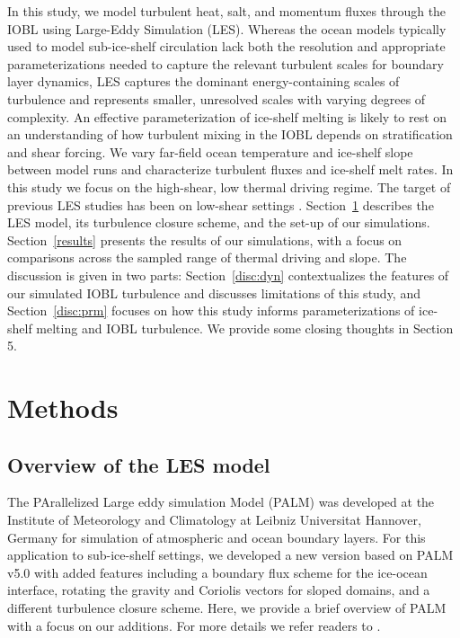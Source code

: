 \documentclass[tc, manuscript]{copernicus}
\begin{document}
In this study, we model turbulent heat, salt, and momentum fluxes through the IOBL using Large-Eddy Simulation (LES). Whereas the ocean models typically used to model sub-ice-shelf circulation lack both the resolution and appropriate parameterizations needed to capture the relevant turbulent scales for boundary layer dynamics, LES captures the dominant energy-containing scales of turbulence and represents smaller, unresolved scales with varying degrees of complexity. An effective parameterization of ice-shelf melting is likely to rest on an understanding of how turbulent mixing in the IOBL depends on stratification and shear forcing. We vary far-field ocean temperature and ice-shelf slope between model runs and characterize turbulent fluxes and ice-shelf melt rates. In this study we focus on the high-shear, low thermal driving regime. The target of previous LES studies has been on low-shear settings \citep{middleton_numerical_2021, vreugdenhil_stratification_2019}. Section~\ref{meth} describes the LES model, its turbulence closure scheme, and the set-up of our simulations. Section~\ref{results} presents the results of our simulations, with a focus on comparisons across the sampled range of thermal driving and slope. The discussion is given in two parts: Section~\ref{disc:dyn} contextualizes the features of our simulated IOBL turbulence and discusses limitations of this study, and Section~\ref{disc:prm} focuses on how this study informs parameterizations of ice-shelf melting and IOBL turbulence. We provide some closing thoughts in Section 5.

\section{Methods}\label{meth}

\subsection{Overview of the LES model}

The PArallelized Large eddy simulation Model (PALM) was developed at the Institute of Meteorology and Climatology at Leibniz Universitat Hannover, Germany \citep{raasch_palm-large-eddy_2001} for simulation of atmospheric and ocean boundary layers. For this application to sub-ice-shelf settings, we developed a new version based on PALM v5.0 \citep{maronga_parallelized_2015} with added features including a boundary flux scheme for the ice-ocean interface, rotating the gravity and Coriolis vectors for sloped domains, and a different turbulence closure scheme. Here, we provide a brief overview of PALM with a focus on our additions. For more details we refer readers to \citet{maronga_parallelized_2015}.
\end{document}
